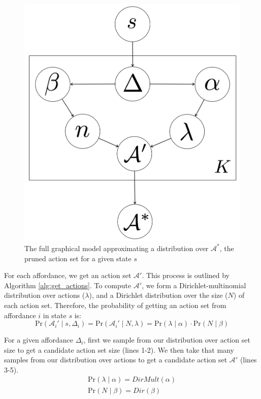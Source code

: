 \documentclass[letterpaper]{article}
\begin{document}
\begin{figure}
\centering
\includegraphics[scale=0.14]{figures/learn_graphical_model.png}%
  \caption{The full graphical model approximating a distribution over $\mathcal{A}^*$, the pruned action set for a given state $s$}
  \label{fig:graphical_model}
\end{figure}

For each affordance, we get an action set $\mathcal{A}'$. This 
process is outlined by Algorithm \ref{alg:get_actions}. To compute $\mathcal{A}'$, we form a Dirichlet-multinomial distribution
over actions ($\lambda$), and a Dirichlet distribution over the size ($N$) of each action set. Therefore, the probability of getting an action set from affordance $i$ in state $s$ is:
\begin{equation}
\text{Pr}(\mathcal{A}_i' \mid s,\Delta_i) = \text{Pr}(\mathcal{A}_i' \mid N, \lambda) = \text{Pr}(\lambda \mid \alpha) \cdot \text{Pr}(N \mid \beta)
\end{equation}

For a given affordance $\Delta_i$, first we sample from our distribution over action set size to get a candidate action set size (lines 1-2). We then
take that many samples from our distribution over actions to get a candidate action set $\mathcal{A}'$ (lines 3-5).
\begin{align}
\text{Pr}(\lambda \mid \alpha) = DirMult(\alpha) \\
\text{Pr}(N \mid \beta) = Dir(\beta)
\end{align}
\end{document}
